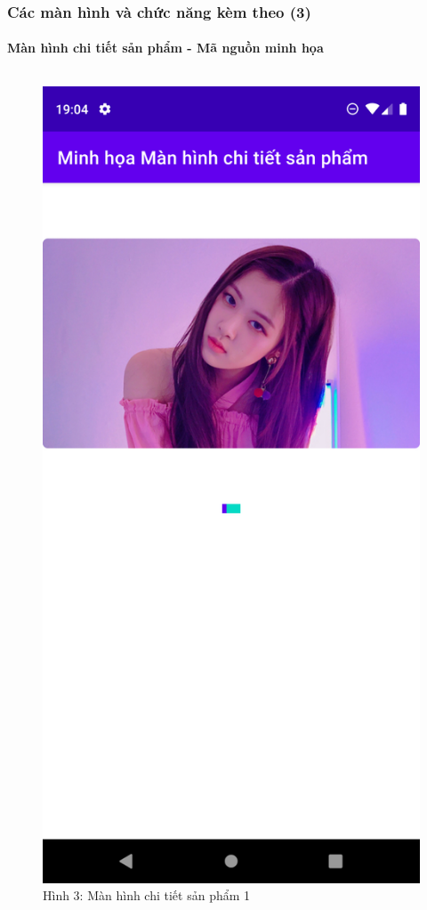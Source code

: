 \documentclass{beamer}
\begin{document}
\begin{frame}
    \frametitle{Các màn hình và chức năng kèm theo (3)}
    \framesubtitle{Màn hình chi tiết sản phẩm - Mã nguồn minh họa}

    \begin{columns}
        \begin{figure}
            \centering
            \includegraphics[height=0.7\textheight]{images/30.png}
            \caption{\centering\tiny{Hình 3: Màn hình chi tiết sản phẩm 1}}


\end{figure}
\end{columns}
\end{frame}
\end{document}
